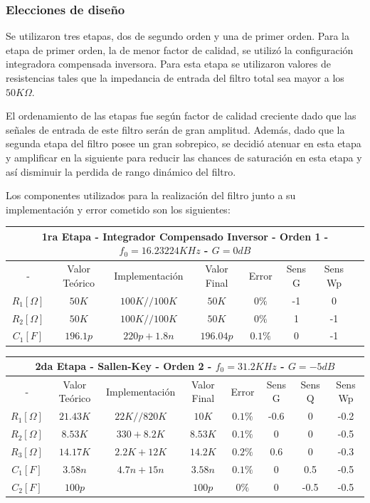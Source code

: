 \subsubsection{Elecciones de diseño}

Se utilizaron tres etapas, dos de segundo orden y una de primer orden. Para la etapa de primer orden, la de menor factor de calidad, se utilizó la configuración integradora compensada inversora. Para esta etapa se utilizaron valores de resistencias tales que la impedancia de entrada del filtro total sea mayor a los $50K\Omega$.

El ordenamiento de las etapas fue según factor de calidad creciente dado que las señales de entrada de este filtro serán de gran amplitud. Además, dado que la segunda etapa del filtro posee un gran sobrepico, se decidió atenuar en esta etapa y amplificar en la siguiente para reducir las chances de saturación en esta etapa y así disminuir la perdida de rango dinámico del filtro.

Los componentes utilizados para la realización del filtro junto a su implementación y error cometido son los siguientes:

\begin{table}[H]
\centering
\begin{tabular}{@{}cccccccc@{}}
\multicolumn{8}{c}{1ra Etapa - Integrador Compensado Inversor - Orden 1 - $f_0 = 16.23224KHz$ - $G=0dB$} \\ \midrule
- & Valor Teórico & Implementación & Valor Final & Error & Sens G  & Sens Wp \\ \midrule
$R_1 [\Omega]$ & $50K$ & $100K//100K$ & $50K$ & $0\%$ & -1 & 0 \\
$R_2 [\Omega]$ & $50K$ & $100K//100K$ & $50K$ & $0\%$ & 1 & -1 \\
$C_1 [F]$ & $196.1p$ & $220p+1.8n$ & $196.04p$ & $0.1\%$ & 0 & -1 \\
\bottomrule
\end{tabular}
\end{table}

\begin{table}[H]
\centering
\begin{tabular}{@{}cccccccc@{}}
\multicolumn{8}{c}{2da Etapa - Sallen-Key - Orden 2 - $f_0 = 31.2KHz$ - $G=-5dB$} \\ \midrule
- & Valor Teórico & Implementación & Valor Final & Error & Sens G & Sens Q & Sens Wp \\ \midrule
$R_1 [\Omega]$ & $21.43K$ & $22K//820K$ & $10K$ & $0.1\%$ & -0.6 & 0 & -0.2 \\
$R_2 [\Omega]$ & $8.53K$ & $330+8.2K$ & $8.53K$ & $0.1\%$ & 0 & 0 & -0.5 \\
$R_3 [\Omega]$ & $14.17K$ & $2.2K+12K$ & $14.2K$ & $0.2\%$ & 0.6 & 0 & -0.3 \\
$C_1 [F]$ & $3.58n$ & $4.7n+15n$ & $3.58n$ & $0.1\%$ & 0 & 0.5 & -0.5 \\
$C_2 [F]$ & $100p$ &  & $100p$ & $0\%$ & 0 & -0.5 & -0.5 \\ \bottomrule
\end{tabular}
\end{table}
 
